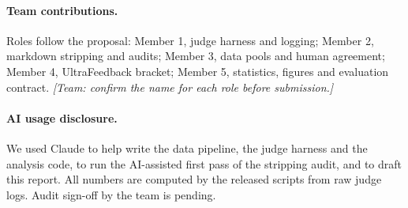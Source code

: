 \documentclass[10pt]{article}
\begin{document}
\paragraph{Team contributions.} Roles follow the proposal: Member 1, judge harness and logging; Member 2, markdown
stripping and audits; Member 3, data pools and human agreement; Member 4, UltraFeedback bracket; Member 5,
statistics, figures and evaluation contract. \textit{[Team: confirm the name for each role before submission.]}

\paragraph{AI usage disclosure.} We used Claude to help write the data pipeline, the judge harness and the
analysis code, to run the AI-assisted first pass of the stripping audit, and to draft this report. All numbers
are computed by the released scripts from raw judge logs. Audit sign-off by the team is pending.
\end{document}
